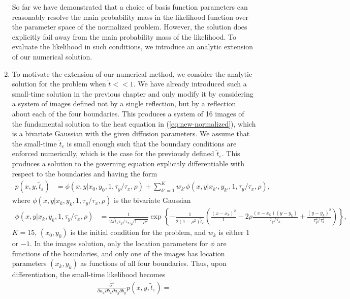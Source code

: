 \documentclass[10pt]{article}
\begin{document}
\begin{enumerate}
So far we have demonstrated that a choice of basis function parameters
can reasonably resolve the main probability mass in the likelihood
function over the parameter space of the normalized problem. However,
the solution does explicitly fail away from the main probability mass
of the likelihood. To evaluate the likelihood in such conditions, we
introduce an analytic extension of our numerical solution.

\item To motivate the extension of our numerical method, we consider
  the analytic solution for the problem when $\tilde{t} << 1$. We have
  already introduced such a small-time solution in the previous
  chapter and only modify it by considering a system of images defined
  not by a single reflection, but by a reflection about each of the
  four boundaries. This produces a system of 16 images of the
  fundamental solution to the heat equation in
  (\ref{eq:new-normalized}), which is a bivariate Gaussian with the
  given diffusion parameters.  We assume that the small-time
  $\tilde{t}_{\varepsilon}$ is small enough such that the boundary
  conditions are enforced numerically, which is the case for the
  previously defined $\tilde{t}_\varepsilon$. This produces a solution
  to the governing equation explicitly differentiable with respect to
  the boundaries and having the form
  \begin{align}
    p(x,y,\tilde{t}_\varepsilon) &= \phi(x,y | x_0, y_0, 1, \tau_y/\tau_x, \rho) + \sum_{k' =1}^K
    w_{k'} \phi(x,y | x_{k'}, y_{k'}, 1, \tau_y/\tau_x, \rho),
  \end{align}
  where $\phi(x,y | x_k, y_k, 1, \tau_y/\tau_x, \rho)$ is the
  bivariate Gaussian
  \begin{align}
    \phi(x,y | x_k, y_k, 1, \tau_y/\tau_x, \rho) &= \frac{1}{2\pi \tilde{t}_\varepsilon \tau_y/\tau_x \sqrt{1-\rho^2}}  \exp\left\{ -\frac{1}{2(1-\rho^2)\tilde{t}_\varepsilon} \left( \frac{(x - x_k)^2}{1} - 2\rho \frac{(x-x_k)(y-y_k)}{\tau_y/\tau_x} +  \frac{(y - y_k)^2}{\tau_y^2/\tau_x^2}  \right)  \right\},
  \end{align}
  $K=15$, $(x_0, y_0)$ is the initial condition for the problem, and
  $w_k$ is either $1$ or $-1$. In the images solution, only the
  location parameters for $\phi$ are functions of the boundaries, and
  only one of the images has location parameters $(x_k, y_k)$ as functions of all four
  boundaries. Thus, upon differentiation, the small-time likelihood
  becomes
    \begin{align}
      \frac{\partial^4}{\partial a_x \partial b_x \partial a_y \partial b_y}p(x,y,\tilde{t}_\varepsilon) = \nonumber \\

\end{align}
\end{enumerate}
\end{document}
